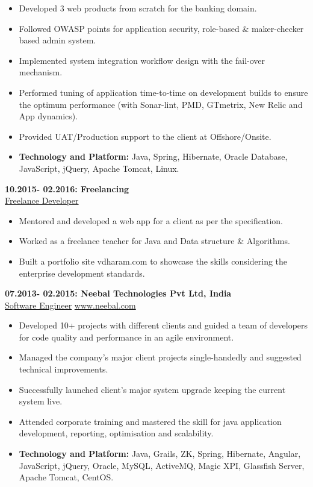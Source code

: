 \documentclass{article}
\begin{document}
\begin{itemize}
	\itemsep0em
\item Developed 3 web products from scratch for the banking domain.
\item Followed OWASP points for application security, role-based \& maker-checker based admin system.
\item Implemented system integration workflow design with the fail-over mechanism.
\item Performed tuning of application time-to-time on development builds to ensure the optimum performance (with Sonar-lint, PMD, GTmetrix, New Relic and App dynamics).
\item Provided UAT/Production support to the client at Offshore/Onsite.
\item \textbf{Technology and Platform:} Java, Spring, Hibernate, Oracle Database, JavaScript, jQuery, Apache Tomcat, Linux.
\end{itemize}
\textbf{10.2015- 02.2016: \hfill Freelancing\\}
\underline{Freelance Developer}
\begin{itemize}
	\itemsep0em
	\item Mentored and developed a web app for a client as per the specification.
	\item Worked as a freelance teacher for Java and Data structure \& Algorithms.
	\item Built a portfolio site vdharam.com to showcase the skills considering the enterprise development standards.
\end{itemize}
\textbf{07.2013- 02.2015: \hfill Neebal Technologies Pvt Ltd, India \\}
\underline{Software Engineer} \hfill \href{www.neebal.com}{www.neebal.com}
\begin{itemize}
	\itemsep0em
	\item Developed 10+ projects with different clients and guided a team of developers for code quality and performance in an agile environment.
	\item Managed the company’s major client projects single-handedly and suggested technical improvements.
	\item Successfully launched client’s major system upgrade keeping the current system live.
	\item Attended corporate training and mastered the skill for java application development, reporting, optimisation and scalability.
	\item \textbf{Technology and Platform:} Java, Grails, ZK, Spring, Hibernate, Angular, JavaScript, jQuery, Oracle, MySQL, ActiveMQ, Magic XPI, Glassfish Server, Apache Tomcat, CentOS.
\end{itemize}
\end{document}
